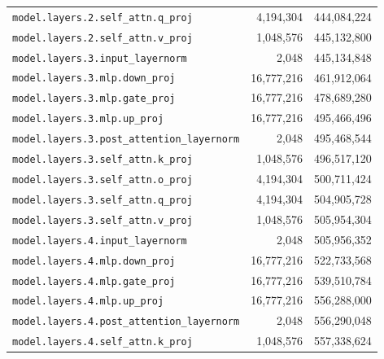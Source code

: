 \documentclass[10pt,a4paper]{article}
\begin{document}
\begin{appendices}
\begin{longtable}{p{9.5cm}rr}
\texttt{model.\allowbreak{}layers.\allowbreak{}2.\allowbreak{}self\_attn.\allowbreak{}q\_proj} & 4,194,304 & 444,084,224 \\
\texttt{model.\allowbreak{}layers.\allowbreak{}2.\allowbreak{}self\_attn.\allowbreak{}v\_proj} & 1,048,576 & 445,132,800 \\
\texttt{model.\allowbreak{}layers.\allowbreak{}3.\allowbreak{}input\_layernorm} & 2,048 & 445,134,848 \\
\texttt{model.\allowbreak{}layers.\allowbreak{}3.\allowbreak{}mlp.\allowbreak{}down\_proj} & 16,777,216 & 461,912,064 \\
\texttt{model.\allowbreak{}layers.\allowbreak{}3.\allowbreak{}mlp.\allowbreak{}gate\_proj} & 16,777,216 & 478,689,280 \\
\texttt{model.\allowbreak{}layers.\allowbreak{}3.\allowbreak{}mlp.\allowbreak{}up\_proj} & 16,777,216 & 495,466,496 \\
\texttt{model.\allowbreak{}layers.\allowbreak{}3.\allowbreak{}post\_attention\_layernorm} & 2,048 & 495,468,544 \\
\texttt{model.\allowbreak{}layers.\allowbreak{}3.\allowbreak{}self\_attn.\allowbreak{}k\_proj} & 1,048,576 & 496,517,120 \\
\texttt{model.\allowbreak{}layers.\allowbreak{}3.\allowbreak{}self\_attn.\allowbreak{}o\_proj} & 4,194,304 & 500,711,424 \\
\texttt{model.\allowbreak{}layers.\allowbreak{}3.\allowbreak{}self\_attn.\allowbreak{}q\_proj} & 4,194,304 & 504,905,728 \\
\texttt{model.\allowbreak{}layers.\allowbreak{}3.\allowbreak{}self\_attn.\allowbreak{}v\_proj} & 1,048,576 & 505,954,304 \\
\texttt{model.\allowbreak{}layers.\allowbreak{}4.\allowbreak{}input\_layernorm} & 2,048 & 505,956,352 \\
\texttt{model.\allowbreak{}layers.\allowbreak{}4.\allowbreak{}mlp.\allowbreak{}down\_proj} & 16,777,216 & 522,733,568 \\
\texttt{model.\allowbreak{}layers.\allowbreak{}4.\allowbreak{}mlp.\allowbreak{}gate\_proj} & 16,777,216 & 539,510,784 \\
\texttt{model.\allowbreak{}layers.\allowbreak{}4.\allowbreak{}mlp.\allowbreak{}up\_proj} & 16,777,216 & 556,288,000 \\
\texttt{model.\allowbreak{}layers.\allowbreak{}4.\allowbreak{}post\_attention\_layernorm} & 2,048 & 556,290,048 \\
\texttt{model.\allowbreak{}layers.\allowbreak{}4.\allowbreak{}self\_attn.\allowbreak{}k\_proj} & 1,048,576 & 557,338,624 \\

\end{longtable}
\end{appendices}
\end{document}
